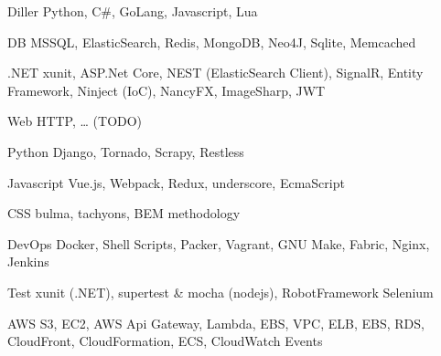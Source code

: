 

\begin{cvskills}



  \cvskill
    {Diller} %
    { Python, C\#, GoLang, Javascript, Lua } %

  
  \cvskill
    {DB}
    { MSSQL,  ElasticSearch, Redis, MongoDB, Neo4J, Sqlite, Memcached}
    
  \cvskill
    {.NET}
    { xunit, ASP.Net Core, NEST (ElasticSearch Client), SignalR, Entity Framework, Ninject (IoC), NancyFX, ImageSharp, JWT }
 
  \cvskill
    {Web}
    {HTTP, … (TODO)}
    
  \cvskill
    {Python}
    { Django, Tornado, Scrapy, Restless }

  \cvskill
    {Javascript}
    { Vue.js, Webpack, Redux, underscore, EcmaScript }

  \cvskill
    {CSS}
    { bulma, tachyons, BEM methodology }

  \cvskill
    {DevOps}
    { Docker, Shell Scripts, Packer, Vagrant, GNU Make, Fabric, Nginx, Jenkins }
  
  \cvskill
    {Test}
    { xunit (.NET), supertest & mocha (nodejs), RobotFramework Selenium }
    
  \cvskill
    {AWS}
    { S3, EC2, AWS Api Gateway, Lambda, EBS, VPC, ELB, EBS, RDS, CloudFront, CloudFormation, ECS, CloudWatch Events }
         
\end{cvskills}



